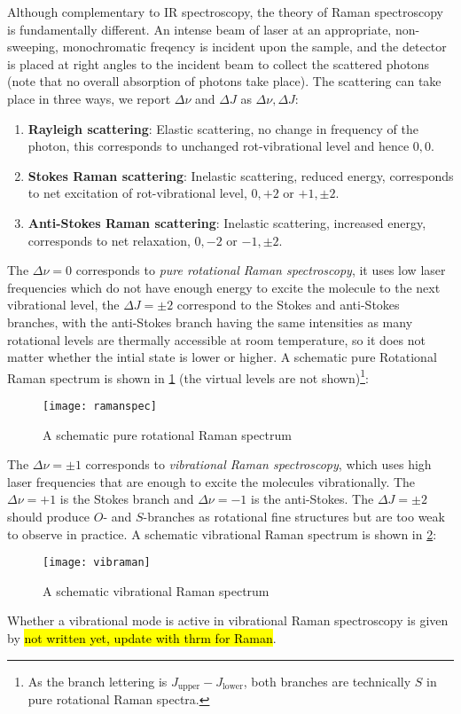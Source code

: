 Although complementary to IR spectroscopy, the theory of Raman spectroscopy is fundamentally different. 
An intense beam of laser at an appropriate, non-sweeping, monochromatic freqency is incident upon the sample, and the detector is placed at right angles to the incident beam to collect the scattered photons (note that no overall absorption of photons take place). The scattering can take place in three ways, we report $\Delta\nu$ and $\Delta J$ as ${\Delta\nu,\Delta J}$:
\begin{enumerate}
	\item \textbf{Rayleigh scattering}: Elastic scattering, no change in frequency of the photon, this corresponds to unchanged rot-vibrational level and hence ${0,0}$.
	\item \textbf{Stokes Raman scattering}: Inelastic scattering, reduced energy, corresponds to net excitation of rot-vibrational level, ${0,+2}$ or $+1,\pm2$.
	\item \textbf{Anti-Stokes Raman scattering}: Inelastic scattering, increased energy, corresponds to net relaxation, ${0,-2}$ or ${-1,\pm2}$.
\end{enumerate}
The $\Delta\nu=0$ corresponds to \emph{pure rotational Raman spectroscopy}, it uses low laser frequencies which do not have enough energy to excite the molecule to the next vibrational level, the $\Delta J=\pm2$ correspond to the Stokes and anti-Stokes branches, with the anti-Stokes branch having the same intensities as many rotational levels are thermally accessible at room temperature, so it does not matter whether the intial state is lower or higher. A schematic pure Rotational Raman spectrum is shown in \cref{fig:purerotspec} (the virtual levels are not shown)\footnote{As the branch lettering is $J_{\mathrm{upper}}-J_{\mathrm{lower}} $, both branches are technically $S$ in pure rotational Raman spectra.}:
\begin{figure}[H]
	\texttt{[image: ramanspec]}
	\centering
	\caption{A schematic pure rotational Raman spectrum}
	\label{fig:purerotspec}
\end{figure}
The $\Delta\nu=\pm1$ corresponds to \emph{vibrational Raman spectroscopy}, which uses high laser frequencies that are enough to excite the molecules vibrationally. The $\Delta\nu=+1$ is the Stokes branch and $\Delta\nu=-1$ is the anti-Stokes. The $\Delta J=\pm2$ should produce $O$- and $S$-branches as rotational fine structures but are too weak to observe in practice. A schematic vibrational Raman spectrum is shown in \cref{fig:vibraman}:
\begin{figure}[H]
	\texttt{[image: vibraman]}
	\centering
	\caption{A schematic vibrational Raman spectrum}
	\label{fig:vibraman}
\end{figure}
Whether a vibrational mode is active in vibrational Raman spectroscopy is given by  \hl{not written yet, update with thrm for Raman}.
